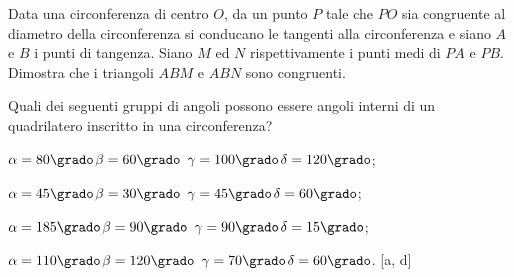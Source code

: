 \begin{multicols}{2}
\begin{esercizio}
\label{ese:5.39}
Data una circonferenza di centro $O$, da un punto $P$ tale che $PO$ 
sia congruente al diametro della circonferenza si conducano le 
tangenti alla circonferenza e siano $A$ e $B$ i punti di tangenza. 
Siano $M$ ed $N$ rispettivamente i punti medi di $PA$ e $PB$. 
Dimostra che i triangoli $ABM$ e $ABN$ sono congruenti.
\end{esercizio}


\end{multicols}



\begin{esercizio}
\label{ese:5.41}
Quali dei seguenti gruppi di angoli possono essere angoli interni di 
un quadrilatero inscritto in una circonferenza?
\begin{enumeratea}
\item $\alpha=80\grado$\quad$\beta=60\grado$\quad 
$\gamma=100\grado$\quad $\delta=120\grado$;
\item $\alpha=45\grado$\quad $\beta=30\grado$\quad 
$\gamma=45\grado$\quad $\delta=60\grado$;
\item $\alpha=185\grado$\quad $\beta=90\grado$\quad 
$\gamma=90\grado$\quad $\delta=15\grado$;
\item $\alpha=110\grado$\quad $\beta=120\grado$\quad 
$\gamma=70\grado$\quad $\delta=60\grado$.
\hfill [a, d]
\end{enumeratea}
\end{esercizio}

